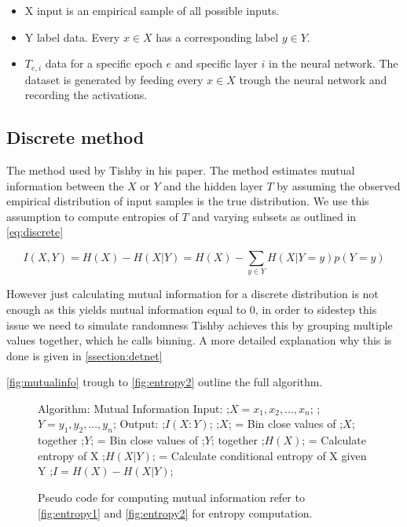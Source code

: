 \documentclass[dissertation.tex]{subfiles}
\begin{document}
\begin{itemize}
  \item{
      X input is an empirical sample of all possible inputs.
    }
  \item{
      Y label data. Every $x \in X$ has a corresponding label $y \in Y$. 
    }
  \item{
      $T_{e,i}$ data for a specific epoch $e$ and specific layer $i$ in the
      neural network. The dataset is  generated by feeding every $x \in X$
      trough the neural network and recording the activations.
    }
\end{itemize}

\subsection{Discrete method} 

  The method used by Tishby in his paper. The method estimates mutual
  information between the $X$ or $Y$ and the hidden layer $T$ by assuming the
  observed empirical distribution of input samples is the true distribution. We
  use this assumption to compute entropies of $T$ and varying subsets as
  outlined in \autoref{eq:discrete}

\begin{equation}
  I(X, Y) = H(X) - H(X|Y) = H(X) - \sum _{y\in Y} H(X|Y = y)p(Y = y)
\label{eq:discrete}
\end{equation} 


  However just calculating mutual information for a discrete distribution is not
  enough as this yields mutual information equal to 0, in order to sidestep this
  issue we need to simulate randomness Tishby achieves this by grouping multiple
  values together, which he calls binning. A more detailed explanation why this
  is done is given in \autoref{ssection:detnet}

   \autoref{fig:mutualinfo} trough to \autoref{fig:entropy2} outline the full
   algorithm.
\begin{figure}[H]
    \begin{pythonfigure}
      Algorithm: Mutual Information
      Input: 
      ;$X = x_1, x_2,...,x_n$;
      ;$Y = y_1, y_2,...,y_n$;
      Output: ;$I(X:Y)$;
      ;$X$; = Bin close values of ;$X$; together
      ;$Y$; = Bin close values of ;$Y$; together
      ;$H(X)$; = Calculate entropy of X
      ;$H(X|Y)$; = Calculate conditional entropy of X given Y
      ;$I = H(X) - H(X|Y)$;
    \end{pythonfigure}
    \caption{Pseudo code for computing mutual information refer to
    \autoref{fig:entropy1} and \autoref{fig:entropy2} for entropy computation.}
    \label{fig:mutualinfo}
\end{figure}
\end{document}

